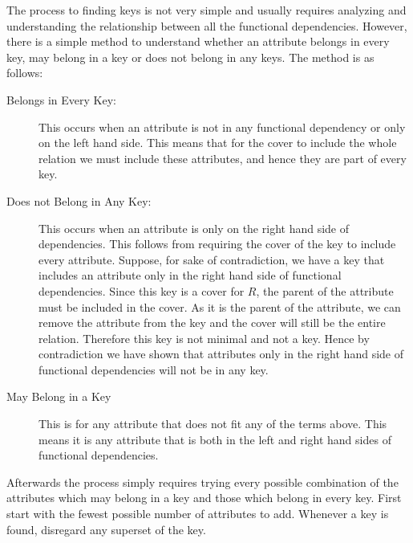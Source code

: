 \documentclass{report}
\begin{document}
\vspace{.5cm}
 \vspace{.5cm}
  The process to finding keys is not very simple and usually requires analyzing and understanding the relationship between all the functional dependencies. However, there is a simple method to understand whether an attribute belongs in every key, may belong in a key or does not belong in any keys. The method is as follows:

  \begin{description}
    \item [Belongs in Every Key:] This occurs when an attribute is not in any functional dependency or only on the left hand side. This means that for the cover to include the whole relation we must include these attributes, and hence they are part of every key.
    \item [Does not Belong in Any Key:] This occurs when an attribute is only on the right hand side of dependencies. This follows from requiring the cover of the key to include every attribute. Suppose, for sake of contradiction, we have a key that includes an attribute only in the right hand side of functional dependencies. Since this key is a cover for $R$, the parent of the attribute must be included in the cover. As it is the parent of the attribute, we can remove the attribute from the key and the cover will still be the entire relation. Therefore this key is not minimal and not a key. Hence by contradiction we have shown that attributes only in the right hand side of functional dependencies will not be in any key.
    \item [May Belong in a Key] This is for any attribute that does not fit any of the terms above. This means it is any attribute that is both in the left and right hand sides of functional dependencies. 
  \end{description}

  Afterwards the process simply requires trying every possible combination of the attributes which may belong in a key and those which belong in every key. First start with the fewest possible number of attributes to add. Whenever a key is found, disregard any superset of the key. 
\end{document}
